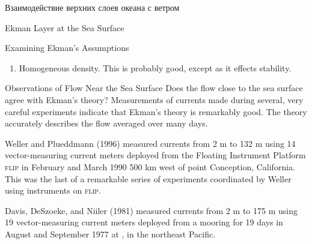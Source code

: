 \begin{chapter}{Взаимодействие верхних слоев океана с ветром}
\begin{section}{Ekman Layer at the Sea Surface}
\begin{paragraph}{Examining Ekman's Assumptions}
\begin{enumerate}
\item 
Homogeneous density. This is probably good, except as it effects
stability.
%
\end{enumerate}
\end{paragraph}

\begin{paragraph}{Observations of Flow Near the Sea Surface}
Does the flow close to the sea
surface agree with Ekman's theory? Measurements of currents made
during several, very careful experiments indicate that Ekman's theory
is remarkably good. The theory accurately describes the flow averaged
over many days.
%

Weller and Plueddmann (1996) measured currents from 2 m to 132 m using
14 vector-measuring current meters deployed from the Floating
Instrument Platform \textsc{flip} in February and March 1990 500 km
west of point Conception, California.  This was the last of a
remarkable series of experiments coordinated by Weller using
instruments on \textsc{flip}.
%

Davis, DeSzoeke, and Niiler (1981) measured currents from 2 m to 175 m
using 19 vector-measuring current meters deployed from a mooring for
19 days in August and September 1977 at ,  in
the northeast Pacific.
%


\end{paragraph}
\end{section}
\end{chapter}
